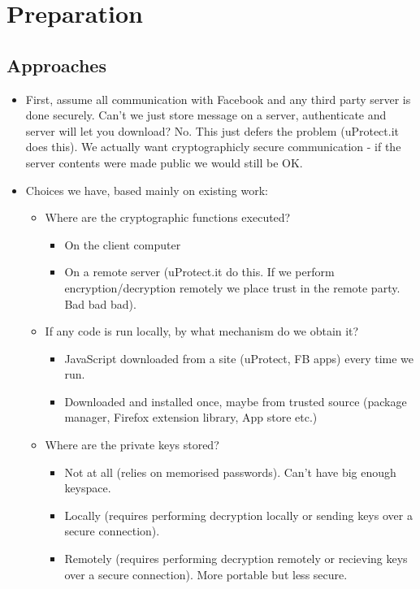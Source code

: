 \chapter{Preparation}\label{ch:preparation}

\section{Approaches}
    \begin{itemize}
        
        \item First, assume all communication with Facebook and any third party server is done securely. Can't we just store message on a server, authenticate and server will let you download? No. This just defers the problem (uProtect.it does this). We actually want cryptographicly secure communication - if the server contents were made public we would still be OK.
        
        \item Choices we have, based mainly on existing work:
        \begin{itemize}
        
        \item Where are the cryptographic functions executed?
            \begin{itemize}
                \item On the client computer
                \item On a remote server (uProtect.it do this. If we perform encryption/decryption remotely we place trust in the remote party. Bad bad bad).
            \end{itemize}
                
        \item If any code is run locally, by what mechanism do we obtain it?
            \begin{itemize}
                \item JavaScript downloaded from a site (uProtect, FB apps) every time we run.
                \item Downloaded and installed once, maybe from trusted source (package manager, Firefox extension library, App store etc.)
            \end{itemize}
                
        \item Where are the private keys stored?
            \begin{itemize}
                \item Not at all (relies on memorised passwords). Can't have big enough keyspace.
                \item Locally (requires performing decryption locally or sending keys over a secure connection). 
                \item Remotely (requires performing decryption remotely or recieving keys over a secure connection). More portable but less secure.
            \end{itemize}
                

\end{itemize}
\end{itemize}
